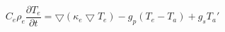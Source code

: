 \documentclass[12pt]{article}
\begin{document}
$$ 
  C_e \rho_e \frac{\partial T_e}{\partial t} = 
  \bigtriangledown (\kappa_e \bigtriangledown T_e) - 
  g_p (T_e - T_a) + g_s T_a'
$$
\end{document}
